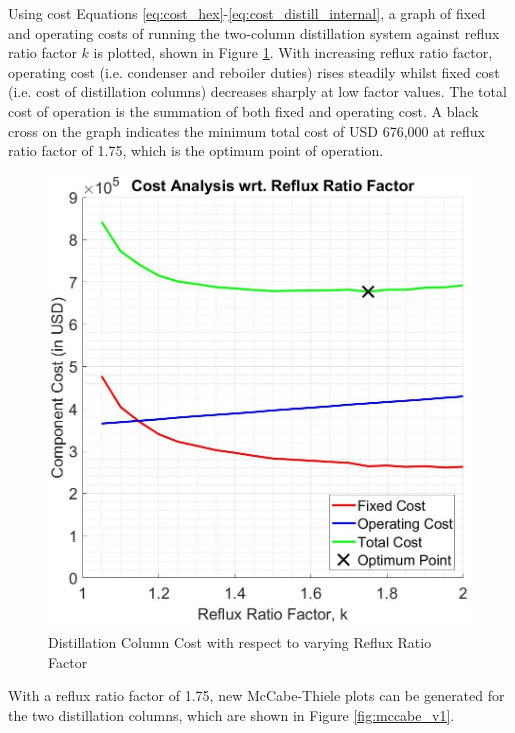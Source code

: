     \noindent Using cost Equations \ref{eq:cost_hex}-\ref{eq:cost_distill_internal}, a graph of fixed and operating costs of running the two-column distillation system against reflux ratio factor $k$ is plotted, shown in Figure \ref{fig:column_cost_vs_reflux}.
    With increasing reflux ratio factor, operating cost (i.e. condenser and reboiler duties) rises steadily whilst fixed cost (i.e. cost of distillation columns) decreases sharply at low factor values. The total cost of operation is the summation of both fixed and operating cost. A black cross on the graph indicates the minimum total cost of USD 676,000 at reflux ratio factor of 1.75, which is the optimum point of operation. \\
    \begin{figure}[H]
        \centering
        \includegraphics[width=0.5\linewidth]{airseparation/graphics/column_cost_vs_reflux.jpg}
        \caption{Distillation Column Cost with respect to varying Reflux Ratio Factor}
        \label{fig:column_cost_vs_reflux}
    \end{figure}
    \noindent With a reflux ratio factor of 1.75, new McCabe-Thiele plots can be generated for the two distillation columns, which are shown in Figure \ref{fig:mccabe_v1}.
